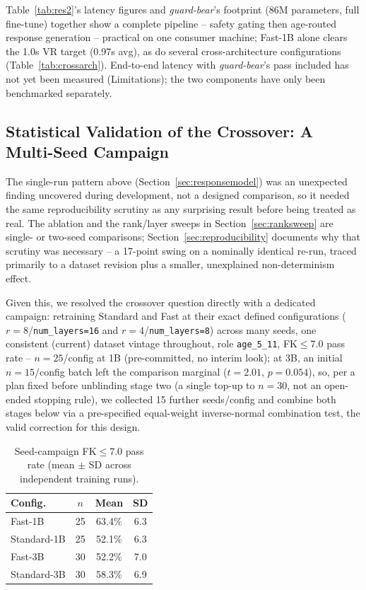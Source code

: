 \documentclass[pdflatex,sn-mathphys-num]{sn-jnl}%
\begin{document}
\label{sec:deployment}Table~\ref{tab:res2}'s latency figures and \textit{guard-bear}'s footprint (86M parameters, full fine-tune) together show a complete pipeline -- safety gating then age-routed response generation -- practical on one consumer machine; Fast-1B alone clears the 1.0s VR target (0.97s avg), as do several cross-architecture configurations (Table~\ref{tab:crossarch}). End-to-end latency with \textit{guard-bear}'s pass included has not yet been measured (Limitations); the two components have only been benchmarked separately.

\subsection{Statistical Validation of the Crossover: A Multi-Seed Campaign}\label{sec:seedcampaign}

The single-run pattern above (Section~\ref{sec:responsemodel}) was an unexpected finding uncovered during development, not a designed comparison, so it needed the same reproducibility scrutiny as any surprising result before being treated as real. The ablation and the rank/layer sweeps in Section~\ref{sec:ranksweep} are single- or two-seed comparisons; Section~\ref{sec:reproducibility} documents why that scrutiny was necessary -- a 17-point swing on a nominally identical re-run, traced primarily to a dataset revision plus a smaller, unexplained non-determinism effect.

Given this, we resolved the crossover question directly with a dedicated campaign: retraining Standard and Fast at their exact defined configurations ($r=8$/\texttt{num\_layers=16} and $r=4$/\texttt{num\_layers=8}) across many seeds, one consistent (current) dataset vintage throughout, role \texttt{age\_5\_11}, FK$\leq$7.0 pass rate -- $n=25$/config at 1B (pre-committed, no interim look); at 3B, an initial $n=15$/config batch left the comparison marginal ($t=2.01$, $p=0.054$), so, per a plan fixed before unblinding stage two (a single top-up to $n=30$, not an open-ended stopping rule), we collected 15 further seeds/config and combine both stages below via a pre-specified equal-weight inverse-normal combination test, the valid correction for this design.

\begin{table}[!h]
  \centering
  \caption{Seed-campaign FK$\leq$7.0 pass rate (mean $\pm$ SD across independent training runs).}
  \label{tab:seedcampaign}
  \small
  \begin{tabular}{@{}lccc@{}}
    \toprule
    Config. & $n$ & Mean & SD \\
    \midrule
    Fast-1B     & 25 & 63.4\% & 6.3 \\
    Standard-1B & 25 & 52.1\% & 6.3 \\
    Fast-3B     & 30 & 52.2\% & 7.0 \\
    Standard-3B & 30 & 58.3\% & 6.9 \\
    \bottomrule
  \end{tabular}
\end{table}
\end{document}
